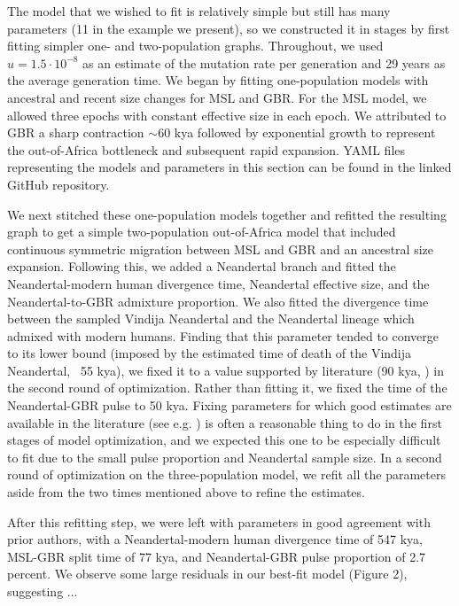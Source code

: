 \documentclass[]{article}
\begin{document}
The model that we wished to fit is relatively simple but still has many parameters (11 in the example we present), so we constructed it in stages by first fitting simpler one- and two-population graphs.
Throughout, we used $u=1.5\cdot 10^{-8}$ as an estimate of the mutation rate per generation and 29 years as the average generation time.
We began by fitting one-population models with ancestral and recent size changes for MSL and GBR.
For the MSL model, we allowed three epochs with constant effective size in each epoch.
We attributed to GBR a sharp contraction $\sim$60 kya followed by exponential growth to represent the out-of-Africa bottleneck and subsequent rapid expansion. YAML files representing the models and parameters in this section can be found in the linked GitHub repository.

We next stitched these one-population models together and refitted the resulting graph to get a simple two-population out-of-Africa model that included continuous symmetric migration between MSL and GBR and an ancestral size expansion. 
Following this, we added a Neandertal branch and fitted the Neandertal-modern human divergence time, Neandertal effective size, and the Neandertal-to-GBR admixture proportion. 
We also fitted the divergence time between the sampled Vindija Neandertal and the Neandertal lineage which admixed with modern humans.
Finding that this parameter tended to converge to its lower bound (imposed by the estimated time of death of the Vindija Neandertal, ~55 kya), we fixed it to a value supported by literature (90 kya, \cite{prufer2017high}) in the second round of optimization.
Rather than fitting it, we fixed the time of the Neandertal-GBR pulse to 50 kya. Fixing parameters for which good estimates are available in the literature (see e.g. \cite{sumer2025earliest}) is often a reasonable thing to do in the first stages of model optimization, and we expected this one to be especially difficult to fit due to the small pulse proportion and Neandertal sample size.
In a second round of optimization on the three-population model, we refit all the parameters aside from the two times mentioned above to refine the estimates. 

After this refitting step, we were left with parameters in good agreement with prior authors, with a Neandertal-modern human divergence time of 547 kya, MSL-GBR split time of 77 kya, and Neandertal-GBR pulse proportion of 2.7 percent. 
We observe some large residuals in our best-fit model (Figure 2), suggesting ...
\end{document}
